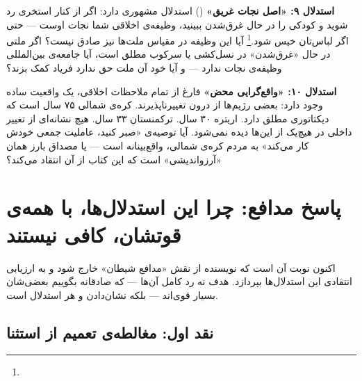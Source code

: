\begin{tcolorbox}[successbox, title={ده استدلال قوی به نفع نجات‌طلبی فداکارانه}]
\textbf{استدلال ۹: «اصل نجات غریق»}
 () استدلال مشهوری دارد: اگر از کنار استخری رد شوید و کودکی را در حال غرق‌شدن ببینید، وظیفه‌ی اخلاقی شما نجات اوست — حتی اگر لباس‌تان خیس شود.\footnote{} آیا این وظیفه در مقیاس ملت‌ها نیز صادق نیست؟ اگر ملتی در حال «غرق‌شدن» در نسل‌کشی یا سرکوب مطلق است، آیا جامعه‌ی بین‌المللی وظیفه‌ی نجات ندارد — و آیا خود آن ملت حق ندارد فریاد کمک بزند؟

\textbf{استدلال ۱۰: «واقع‌گرایی محض»}
فارغ از تمام ملاحظات اخلاقی، یک واقعیت ساده وجود دارد: بعضی رژیم‌ها از درون تغییرناپذیرند. کره‌ی شمالی ۷۵ سال است که دیکتاتوری مطلق دارد. اریتره ۳۰ سال. ترکمنستان ۳۳ سال. هیچ نشانه‌ای از تغییر داخلی در هیچ‌یک از این‌ها دیده نمی‌شود. آیا توصیه‌ی «صبر کنید، عاملیت جمعی خودش کار می‌کند» به مردم کره‌ی شمالی، واقع‌بینانه است — یا مصداق بارز همان «آرزواندیشی» است که این کتاب از آن انتقاد می‌کند؟
\end{tcolorbox}


\section{پاسخ مدافع: چرا این استدلال‌ها، با همه‌ی قوتشان، کافی نیستند}
\label{sec:ch15-counterarguments}

اکنون نوبت آن است که نویسنده از نقش «مدافع شیطان» خارج شود و به ارزیابی انتقادی این استدلال‌ها بپردازد. هدف نه رد کامل آن‌ها — که صادقانه بگوییم بعضی‌شان بسیار قوی‌اند — بلکه نشان‌دادن  و  هر استدلال است.

\subsection{نقد اول: مغالطه‌ی تعمیم از استثنا}
\label{subsec:ch15-critique-generalization}

